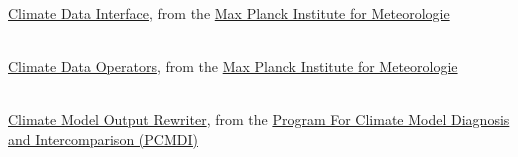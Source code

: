 \begin{thebibliography}{xx}


 \ \\
  \href{https://code.zmaw.de/projects/cdi}
       {Climate Data Interface},
  from the
  \href{http://www.mpimet.mpg.de}
       {Max Planck Institute for Meteorologie}


 \ \\
  \href{https://code.zmaw.de/projects/cdo}
       {Climate Data Operators},
  from the
  \href{http://www.mpimet.mpg.de}
       {Max Planck Institute for Meteorologie}


 \ \\
  \href{git://github.com/PCMDI/cmor.git}
       {Climate Model Output Rewriter},
  from the
  \href{https://www-pcmdi.llnl.gov}
       { Program For Climate Model Diagnosis and Intercomparison (PCMDI)}


\end{thebibliography}

